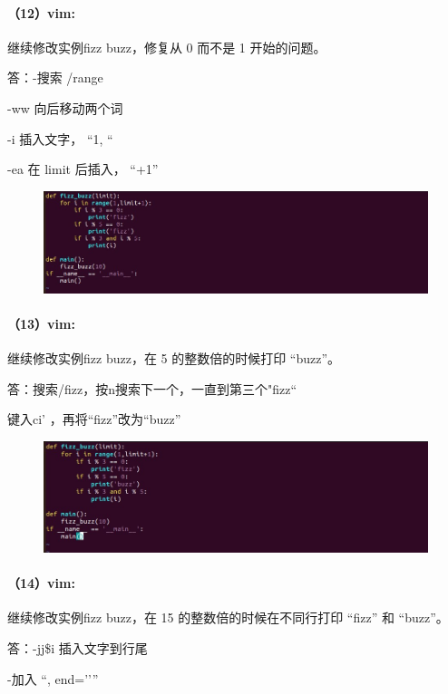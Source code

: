 \documentclass[a4paper, 12pt]{article}
\begin{document}
	\paragraph{（12）vim:}
	继续修改实例fizz buzz，修复从 0 而不是 1 开始的问题。
	
	答：-搜索 /range
	
	-ww 向后移动两个词
	
	-i 插入文字， “1, “
	
	-ea 在 limit 后插入， “+1”
	
	\begin{figure}[H]
		\centering
		\includegraphics[width=1\textwidth]{035.jpg}
	\end{figure}
	
	\paragraph{（13）vim:}
	继续修改实例fizz buzz，在 5 的整数倍的时候打印 “buzz”。
	
	答：搜索/fizz，按n搜索下一个，一直到第三个"fizz“
	
	键入ci' ，再将“fizz”改为“buzz”
	
	\begin{figure}[H]
		\centering
		\includegraphics[width=1\textwidth]{036.jpg}
	\end{figure}
	
	\paragraph{（14）vim:}
	继续修改实例fizz buzz，在 15 的整数倍的时候在不同行打印 “fizz” 和 “buzz”。
	
	答：-jj\$i 插入文字到行尾
	
	-加入 “, end=’’”
	
\end{document}
